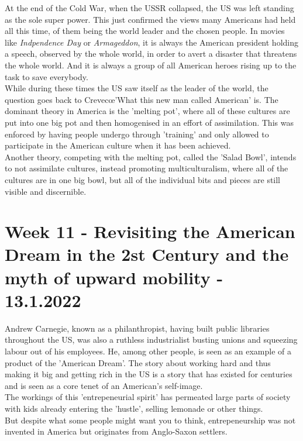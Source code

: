 \documentclass{article}
\begin{document}
	At the end of the Cold War, when the USSR collapsed, the US was left standing as the sole super power. This just confirmed the views many Americans had held all this time, of them being the world leader and the chosen people. In movies like \textit{Indpendence Day} or \textit{Armageddon}, it is always the American president holding a speech, observed by the whole world, in order to avert a disaster that threatens the whole world. And it is always a group of all American heroes rising up to the task to save everybody. \\
	While during these times the US saw itself as the leader of the world, the question goes back to Crevec\oe 'What this new man called American' is. The dominant theory in America is the 'melting pot', where all of these cultures are put into one big pot and then homogenised in an effort of assimilation. This was enforced by having people undergo through 'training' and only allowed to participate in the American culture when it has been achieved. \\
	Another theory, competing with the melting pot, called the 'Salad Bowl', intends to not assimilate cultures, instead promoting multiculturalism, where all of the cultures are in one big bowl, but all of the individual bits and pieces are still visible and discernible. \\

	\section{Week 11 - Revisiting the American Dream in the 2st Century and the myth of upward mobility - 13.1.2022}

	Andrew Carnegie, known as a philanthropist, having built public libraries throughout the US, was also a ruthless industrialist busting unions and squeezing labour out of his employees. He, among other people, is seen as an example of a product of the 'American Dream'. The story about working hard and thus making it big and getting rich in the US is a story that has existed for centuries and is seen as a core tenet of an American's self-image. \\
	The workings of this 'entrepeneurial spirit' has permeated large parts of society with kids already entering the 'hustle', selling lemonade or other things. \\
	But despite what some people might want you to think, entrepeneurship was not invented in America but originates from Anglo-Saxon settlers. \\
\end{document}
